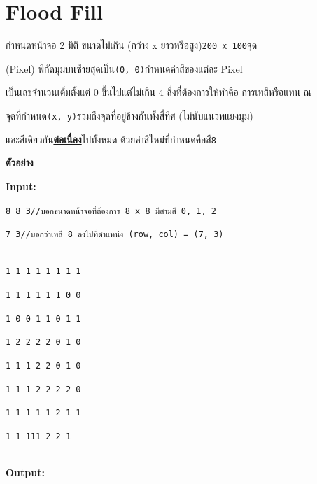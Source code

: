 \documentclass{article}
\begin{document}
\section*{Flood Fill}

กำหนดหน้าจอ 2 มิติ ขนาดไม่เกิน (กว้าง x ยาวหรือสูง)\texttt{200\ x\ 100}จุด

(Pixel) พิกัดมุมบนซ้ายสุดเป็น\texttt{(0,\ 0)}กำหนดค่าสีของแต่ละ Pixel

เป็นเลขจำนวนเต็มตั้งแต่ 0 ขึ้นไปแต่ไม่เกิน 4 สิ่งที่ต้องการให้ทำคือ การเทสีหรือแทน ณ

จุดที่กำหนด\texttt{(x,\ y)}รวมถึงจุดที่อยู่ข้างกันทั้งสี่ทิศ (ไม่นับแนวทแยงมุม)

และสีเดียวกัน\ul{\textbf{ต่อเนื่อง}}ไปทั้งหมด ด้วยค่าสีใหม่ที่กำหนดคือสี\texttt{8}



\hfill\break



\textbf{ตัวอย่าง}



\textbf{Input:}



\texttt{8\ 8\ 3}{}{\texttt{//}}{\texttt{บอกขนาดหน้าจอที่ต้องการ\ 8\ x\ 8\ มีสามสี\ 0,\ 1,\ 2}}{}



\texttt{7\ 3}{\texttt{//}}{\texttt{บอกว่าเทสี\ 8\ ลงไปที่ตำแหน่ง\ (row,\ col)\ =\ (7,\ 3)}}\strut \\



\texttt{1\ 1\ 1\ 1\ 1\ 1\ 1\ 1}



\texttt{1\ 1\ 1\ 1\ 1\ 1\ 0\ 0}



\texttt{1\ 0\ 0\ 1\ 1\ 0\ 1\ 1}



\texttt{1\ 2\ 2\ 2\ 2\ 0\ 1\ 0}



\texttt{1\ 1\ 1\ 2\ 2\ 0\ 1\ 0}



\texttt{1\ 1\ 1\ 2\ 2\ 2\ 2\ 0}



\texttt{1\ 1\ 1\ 1\ 1\ 2\ 1\ 1}



\texttt{1\ 1\ 1}{\texttt{1}}\texttt{1\ 2\ 2\ 1}\strut \\



\textbf{Output:}
\end{document}
